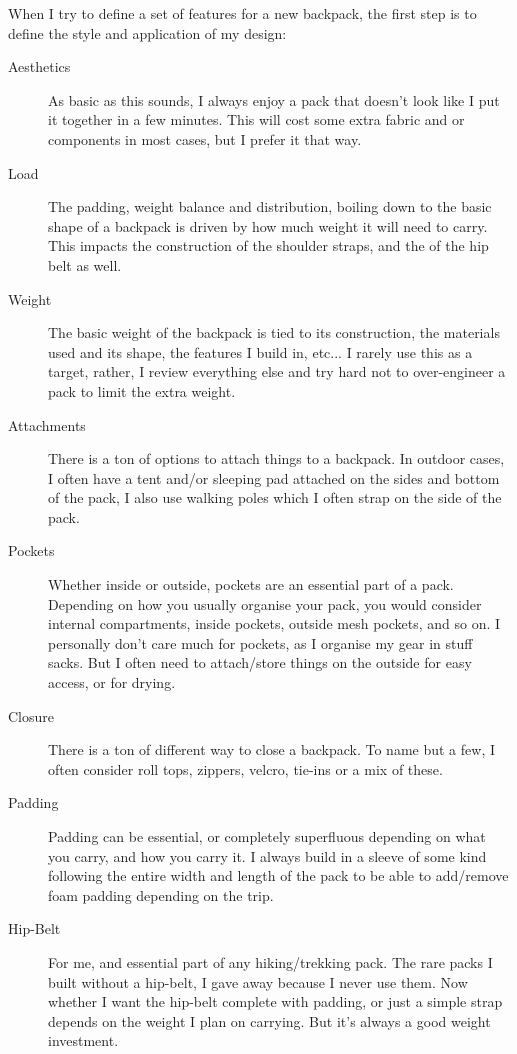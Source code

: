 When I try to define a set of features for a new backpack, the first step is to define the style and application of my design:

\begin{description}

  \item [Aesthetics] As basic as this sounds, I always enjoy a pack that doesn't look like I put it together in a few minutes. This will cost some extra fabric and or components in most cases, but I prefer it that way.

  \item [Load] The padding, weight balance and distribution, boiling down to the basic shape of a backpack is driven by how much weight it will need to carry. This impacts the construction of the shoulder straps, and the of the hip belt as well.

  \item [Weight] The basic weight of the backpack is tied to its construction, the materials used and its shape, the features I build in, etc... I rarely use this as a target, rather, I review everything else and try hard not to over-engineer a pack to limit the extra weight.

  \item [Attachments] There is a ton of options to attach things to a backpack. In outdoor cases, I often have a tent and/or sleeping pad attached on the sides and bottom of the pack, I also use walking poles which I often strap on the side of the pack.

  \item [Pockets] Whether inside or outside, pockets are an essential part of a pack. Depending on how you usually organise your pack, you would consider internal compartments, inside pockets, outside mesh pockets, and so on. I personally don't care much for pockets, as I organise my gear in stuff sacks. But I often need to attach/store things on the outside for easy access, or for drying.

  \item [Closure] There is a ton of different way to close a backpack. To name but a few, I often consider roll tops, zippers, velcro, tie-ins or a mix of these.

  \item [Padding] Padding can be essential, or completely superfluous depending on what you carry, and how you carry it. I always build in a sleeve of some kind following the entire width and length of the pack to be able to add/remove foam padding depending on the trip.

  \item [Hip-Belt] For me, and essential part of any hiking/trekking pack. The rare packs I built without a hip-belt, I gave away because I never use them. Now whether I want the hip-belt complete with padding, or just a simple strap depends on the weight I plan on carrying. But it's always a good weight investment.

\end{description}
